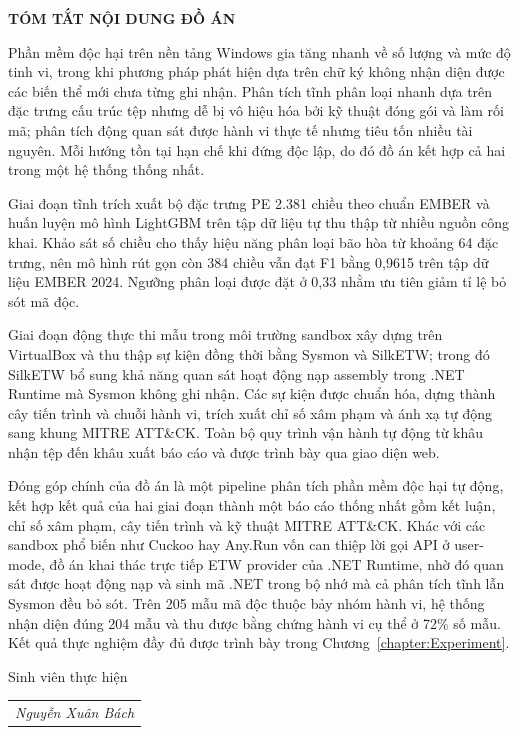 \documentclass[../DoAn.tex]{subfiles}
\begin{document}
\begin{center}
    \Large{\textbf{TÓM TẮT NỘI DUNG ĐỒ ÁN}}\\
\end{center}
\vspace{1cm}
Phần mềm độc hại trên nền tảng Windows gia tăng nhanh về số lượng và mức độ tinh vi, trong khi phương pháp phát hiện dựa trên chữ ký không nhận diện được các biến thể mới chưa từng ghi nhận. Phân tích tĩnh phân loại nhanh dựa trên đặc trưng cấu trúc tệp nhưng dễ bị vô hiệu hóa bởi kỹ thuật đóng gói và làm rối mã; phân tích động quan sát được hành vi thực tế nhưng tiêu tốn nhiều tài nguyên. Mỗi hướng tồn tại hạn chế khi đứng độc lập, do đó đồ án kết hợp cả hai trong một hệ thống thống nhất.

Giai đoạn tĩnh trích xuất bộ đặc trưng PE 2.381 chiều theo chuẩn EMBER và huấn luyện mô hình LightGBM trên tập dữ liệu tự thu thập từ nhiều nguồn công khai. Khảo sát số chiều cho thấy hiệu năng phân loại bão hòa từ khoảng 64 đặc trưng, nên mô hình rút gọn còn 384 chiều vẫn đạt F1 bằng 0,9615 trên tập dữ liệu EMBER 2024. Ngưỡng phân loại được đặt ở 0,33 nhằm ưu tiên giảm tỉ lệ bỏ sót mã độc.

Giai đoạn động thực thi mẫu trong môi trường sandbox xây dựng trên VirtualBox và thu thập sự kiện đồng thời bằng Sysmon và SilkETW; trong đó SilkETW bổ sung khả năng quan sát hoạt động nạp assembly trong .NET Runtime mà Sysmon không ghi nhận. Các sự kiện được chuẩn hóa, dựng thành cây tiến trình và chuỗi hành vi, trích xuất chỉ số xâm phạm và ánh xạ tự động sang khung MITRE ATT\&CK. Toàn bộ quy trình vận hành tự động từ khâu nhận tệp đến khâu xuất báo cáo và được trình bày qua giao diện web.

Đóng góp chính của đồ án là một pipeline phân tích phần mềm độc hại tự động, kết hợp kết quả của hai giai đoạn thành một báo cáo thống nhất gồm kết luận, chỉ số xâm phạm, cây tiến trình và kỹ thuật MITRE ATT\&CK. Khác với các sandbox phổ biến như Cuckoo hay Any.Run vốn can thiệp lời gọi API ở user-mode, đồ án khai thác trực tiếp ETW provider của .NET Runtime, nhờ đó quan sát được hoạt động nạp và sinh mã .NET trong bộ nhớ mà cả phân tích tĩnh lẫn Sysmon đều bỏ sót. Trên 205 mẫu mã độc thuộc bảy nhóm hành vi, hệ thống nhận diện đúng 204 mẫu và thu được bằng chứng hành vi cụ thể ở 72\% số mẫu. Kết quả thực nghiệm đầy đủ được trình bày trong Chương~\ref{chapter:Experiment}.
\vspace{1cm}
\begin{flushright}
Sinh viên thực hiện\\
\begin{tabular}{@{}c@{}}
\textit{Nguyễn Xuân Bách}
\end{tabular}
\end{flushright}
\end{document}
